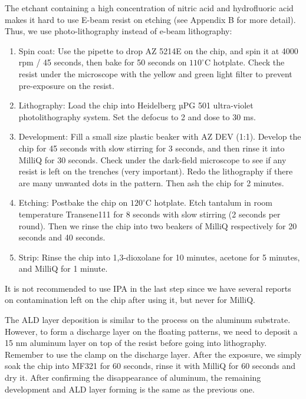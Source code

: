 The etchant containing a high concentration of nitric acid and hydrofluoric acid makes it hard to use E-beam resist on etching (see Appendix B for more detail). Thus, we use photo-lithography instead of e-beam lithography:

\begin{enumerate}
    \item Spin coat: Use the pipette to drop AZ 5214E on the chip, and spin it at 4000 rpm / 45 seconds, then bake for 50 seconds on $110^\circ$C hotplate. Check the resist under the microscope with the yellow and green light filter to prevent pre-exposure on the resist.
    \item Lithography: Load the chip into Heidelberg µPG 501 ultra-violet photolithography system. Set the defocus to 2 and dose to 30 ms.
    \item Development: Fill a small size plastic beaker with AZ DEV (1:1). Develop the chip for 45 seconds with slow stirring for 3 seconds, and then rinse it into MilliQ for 30 seconds. Check under the dark-field microscope to see if any resist is left on the trenches (very important). Redo the lithography if there are many unwanted dots in the pattern. Then ash the chip for 2 minutes.
    \item Etching: Postbake the chip on $120^\circ$C hotplate. Etch tantalum in room temperature Transene111 for 8 seconds with slow stirring (2 seconds per round). Then we rinse the chip into two beakers of MilliQ respectively for 20 seconds and 40 seconds.
    \item Strip: Rinse the chip into 1,3-dioxolane for 10 minutes, acetone for 5 minutes, and MilliQ for 1 minute.
\end{enumerate}

It is not recommended to use IPA in the last step since we have several reports on contamination left on the chip after using it, but never for MilliQ. 

The ALD layer deposition is similar to the process on the aluminum substrate. However, to form a discharge layer on the floating patterns, we need to deposit a 15 nm aluminum layer on top of the resist before going into lithography. Remember to use the clamp on the discharge layer. After the exposure, we simply soak the chip into MF321 for 60 seconds, rinse it with MilliQ for 60 seconds and dry it. After confirming the disappearance of aluminum, the remaining development and ALD layer forming is the same as the previous one. 

